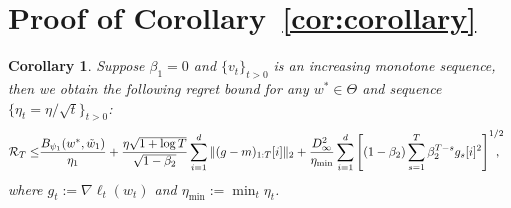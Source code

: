 \documentclass[11pt]{article}
\newtheorem*{Corollary*}{Corollary}
\theoremstyle{k}
\begin{document}
\section{Proof of Corollary~\ref{cor:corollary}}
\begin{Corollary*}
Suppose $\beta_1=0$ and $\{v_t\}_{t>0}$ is an increasing monotone sequence, then we obtain the following regret bound for any $w^{*} \in \Theta$ and sequence $\{ \eta_t = \eta/\sqrt{t}\}_{t>0}$: 
\begin{equation}\notag
\begin{aligned}
\mathcal{R}_T \leq & \frac{ B_{\psi_1}(w^*, \tilde{w}_{1})}{\eta_1}
+ \frac{\eta \sqrt{1 + \log T}}{\sqrt{1 - \beta_2}} \sum_{i=1}^d \| (g-m)_{1:T}[i] \|_2 +\frac{D_{\infty}^2}{\eta_{\min}} \sum_{i=1}^d \left[ (1-\beta_2) \sum_{s=1}^{T} \beta_2^{T-s} g_s[i]^2 \right]^{1/2} \hspace{-0.3cm},
\end{aligned}
\end{equation}
where $g_{t}:= \nabla \ell_{t}(w_t)$ and $\eta_{{\min}} := \min_{{t}} \eta_{t}$.
\end{Corollary*}
\end{document}
